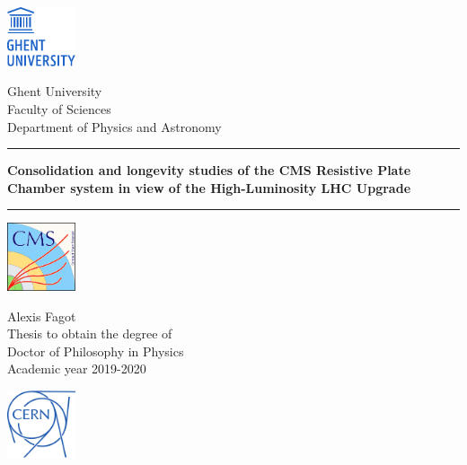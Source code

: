 \documentclass[10pt,a4paper,twoside,dutch,english,openright,leqno]{book}
\begin{document}
% 
 \thispagestyle{empty}   %
% 
 \noindent
 \begin{minipage}{3cm}%
   \href{https://www.ugent.be/}{\includegraphics*[width=2cm]{UGent.pdf}}
 \end{minipage}\hfill
 \begin{minipage}{8cm}
 \raggedleft
 \textsf{Ghent University\\
 Faculty of Sciences\\
 Department of Physics and Astronomy}
 \end{minipage}
\vspace{2cm}
% 
\bigskip
 \hrule
 \vspace{5mm}
   \begin{centering}
     \LARGE \textbf{\textsf{Consolidation and longevity studies of the CMS Resistive Plate Chamber system in view of the High-Luminosity LHC Upgrade}}\\
   \end{centering}
 \vspace{5mm}
 \hrule
% 
 \vfill
 \begin{minipage}{2.0cm}%
     \href{https://cms.cern/}{\includegraphics*[width=2.0cm]{CMS.pdf}}
 \end{minipage}\hfill
 \begin{minipage}{7cm}
 \centering
 \LARGE\textsf{Alexis Fagot\\}
 \vspace{5mm}
 \normalsize\textsf{Thesis to obtain the degree of\\
 Doctor of Philosophy in Physics\\
 Academic year 2019-2020}
 \end{minipage}\hfill
 \begin{minipage}{2.0cm}%
     \href{https://home.cern/}{\includegraphics*[width=2.0cm]{CERN.pdf}}
 \end{minipage}\hfill
\end{document}
